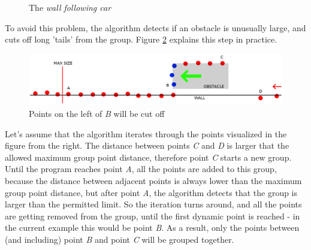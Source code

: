 \begin{figure}[!ht]
    \centering
    \caption{The \textit{wall following car}}
    \label{wall_following_car}
\end{figure}

To avoid this problem, the algorithm detects if an obstacle is unusually large, and cuts off long 'tails' from the group. Figure \ref{group_cutting} explains this step in practice.

\begin{figure}[!ht]
    \centering
    \includegraphics[width=\textwidth]{figures/raw/group_cutting.png}
    \caption{Points on the left of \textit{B} will be cut off}
    \label{group_cutting}
\end{figure}

Let's assume that the algorithm iterates through the points visualized in the figure from the right. The distance between points \textit{C} and \textit{D} is larger that the allowed maximum group point distance, therefore point \textit{C} starts a new group. Until the program reaches point \textit{A}, all the points are added to this group, because the distance between adjacent points is always lower than the maximum group point distance, but after point \textit{A}, the algorithm detects that the group is larger than the permitted limit. So the iteration turns around, and all the points are getting removed from the group, until the first dynamic point is reached - in the current example this would be point \textit{B}. As a result, only the points between (and including) point \textit{B} and point \textit{C} will be grouped together.

